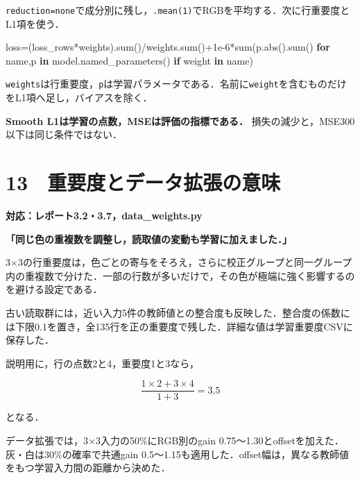 \documentclass[
  14pt,
  a5paper,
]{extarticle}
\newenvironment{Shaded}{}{}
\newcommand{\BuiltInTok}[1]{\textcolor[rgb]{0.00,0.50,0.00}{#1}}
\newcommand{\ControlFlowTok}[1]{\textcolor[rgb]{0.00,0.44,0.13}{\textbf{#1}}}
\newcommand{\FloatTok}[1]{\textcolor[rgb]{0.25,0.63,0.44}{#1}}
\newcommand{\KeywordTok}[1]{\textcolor[rgb]{0.00,0.44,0.13}{\textbf{#1}}}
\newcommand{\NormalTok}[1]{#1}
\newcommand{\OperatorTok}[1]{\textcolor[rgb]{0.40,0.40,0.40}{#1}}
\newcommand{\StringTok}[1]{\textcolor[rgb]{0.25,0.44,0.63}{#1}}
\begin{document}
\texttt{reduction=\textquotesingle{}none\textquotesingle{}}で成分別に残し，\texttt{.mean(1)}でRGBを平均する．次に行重要度とL1項を使う．

\begin{Shaded}
\begin{Highlighting}[]
\NormalTok{loss}\OperatorTok{=}\NormalTok{(loss\_rows}\OperatorTok{*}\NormalTok{weights).}\BuiltInTok{sum}\NormalTok{()}\OperatorTok{/}\NormalTok{weights.}\BuiltInTok{sum}\NormalTok{()}\OperatorTok{+}\FloatTok{1e{-}6}\OperatorTok{*}\BuiltInTok{sum}\NormalTok{(p.}\BuiltInTok{abs}\NormalTok{().}\BuiltInTok{sum}\NormalTok{() }\ControlFlowTok{for}\NormalTok{ name,p }\KeywordTok{in}\NormalTok{ model.named\_parameters() }\ControlFlowTok{if} \StringTok{\textquotesingle{}weight\textquotesingle{}} \KeywordTok{in}\NormalTok{ name)}
\end{Highlighting}
\end{Shaded}

\texttt{weights}は行重要度，\texttt{p}は学習パラメータである．名前に\texttt{weight}を含むものだけをL1項へ足し，バイアスを除く．

\textbf{Smooth L1は学習の点数，MSEは評価の指標である．}
損失の減少と，MSE300以下は同じ条件ではない．

\newpage

\section{13　重要度とデータ拡張の意味}\label{ux91cdux8981ux5ea6ux3068ux30c7ux30fcux30bfux62e1ux5f35ux306eux610fux5473}

\textbf{対応：レポート3.2・3.7，data\_weights.py}

\textbf{「同じ色の重複数を調整し，読取値の変動も学習に加えました．」}

3×3の行重要度は，色ごとの寄与をそろえ，さらに校正グループと同一グループ内の重複数で分けた．一部の行数が多いだけで，その色が極端に強く影響するのを避ける設定である．

古い読取群には，近い入力5件の教師値との整合度も反映した．整合度の係数には下限0.1を置き，全135行を正の重要度で残した．詳細な値は学習重要度CSVに保存した．

説明用に，行の点数2と4，重要度1と3なら，

\[\frac{1\times2+3\times4}{1+3}=3.5\]

となる．

データ拡張では，3×3入力の50\%にRGB別のgain
0.75〜1.30とoffsetを加えた．灰・白は30\%の確率で共通gain
0.5〜1.15も適用した．offset幅は，異なる教師値をもつ学習入力間の距離から決めた．
\end{document}
